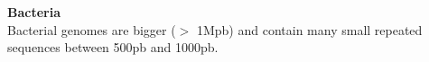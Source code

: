\documentclass[12pt]{article}
\begin{document}
\textbf{Bacteria} \\
Bacterial genomes are bigger ($>$ 1Mpb) and contain many small repeated sequences between 500pb and 1000pb.
\begin{figure}[h!]
\begin{center}
\end{center}
\end{figure}
\end{document}
